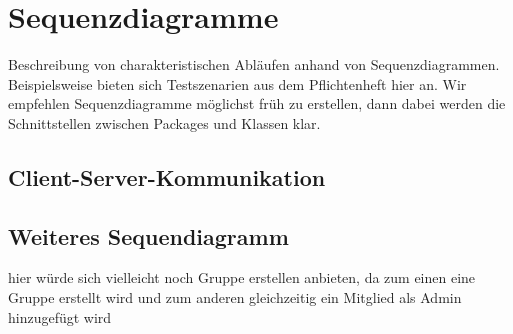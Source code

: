 \section{Sequenzdiagramme}
Beschreibung von charakteristischen Abläufen anhand von Sequenzdiagrammen. Beispielsweise bieten sich Testszenarien aus dem Pflichtenheft hier an. Wir empfehlen Sequenzdiagramme möglichst früh zu erstellen, dann dabei werden die Schnittstellen zwischen Packages und Klassen klar.
\subsection{Client-Server-Kommunikation}
\subsection{Weiteres Sequendiagramm}
hier würde sich vielleicht noch Gruppe erstellen anbieten, da zum einen eine Gruppe erstellt wird und zum anderen gleichzeitig ein Mitglied als Admin hinzugefügt wird